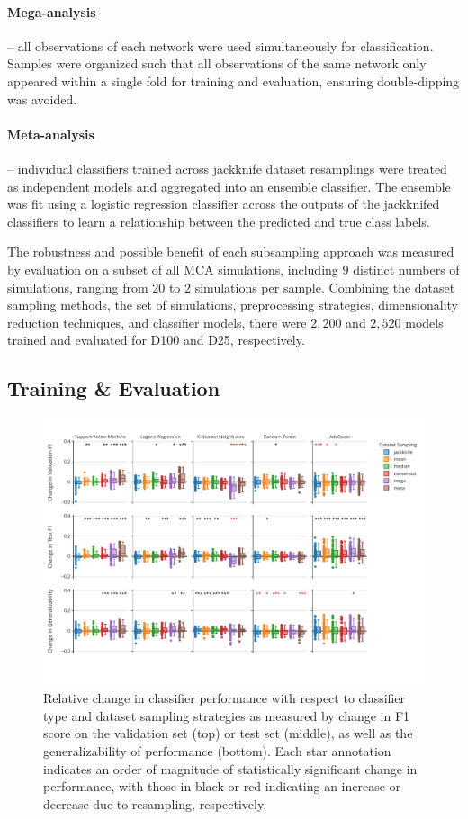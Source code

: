 \documentclass[10pt]{SelfArx} %
\begin{document}
\paragraph{Mega-analysis} – all observations of each network were used simultaneously for classification. Samples were
organized such that all observations of the same network only appeared within a single fold for training and
evaluation, ensuring double-dipping was avoided.

\paragraph{Meta-analysis} – individual classifiers trained across jackknife dataset resamplings were treated as
independent models and aggregated into an ensemble classifier. The ensemble was fit using a logistic regression
classifier across the outputs of the jackknifed classifiers to learn a relationship between the predicted and true
class labels.

The robustness and possible benefit of each subsampling approach was measured by evaluation on a subset of all MCA
simulations, including $9$ distinct numbers of simulations, ranging from $20$ to $2$ simulations per sample. Combining
the dataset sampling methods, the set of simulations, preprocessing strategies, dimensionality reduction techniques,
and classifier models, there were $2,200$ and $2,520$ models trained and evaluated for D100 and D25, respectively.

\subsection*{Training \& Evaluation}

\begin{figure}[hbt]\centering
\includegraphics[width=\linewidth]{figures/1.pdf}
\caption{Relative change in classifier performance with respect to classifier type and dataset sampling strategies as
measured by change in F1 score on the validation set (top) or test set (middle), as well as the generalizability of
performance (bottom). Each star annotation indicates an order of magnitude of statistically significant change in
performance, with those in black or red indicating an increase or decrease due to resampling, respectively.}
\label{fig:overall_performance}
\end{figure}
\end{document}
